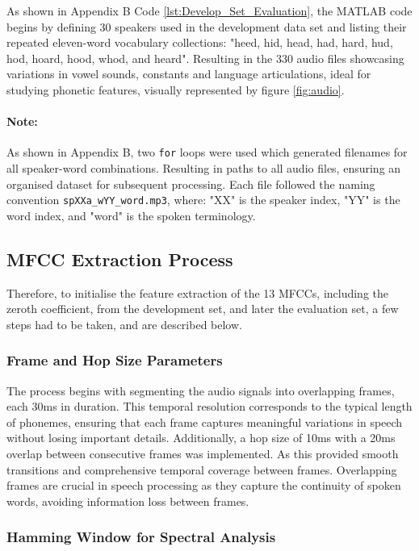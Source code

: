 \documentclass{article}
\begin{document}
As shown in Appendix B Code \ref{lst:Develop_Set_Evaluation}, the MATLAB code begins by defining 30 speakers used in the development data set and listing their repeated eleven-word vocabulary collections: "heed, hid, head, had, hard, hud, hod, hoard, hood, whod, and heard". Resulting in the 330 audio files showcasing variations in vowel sounds, constants and language articulations, ideal for studying phonetic features, visually represented by figure \ref{fig:audio}.

\paragraph{Note:} As shown in Appendix B, two \verb+for+ loops were used which generated filenames for all speaker-word combinations. Resulting in paths to all audio files, ensuring an organised dataset for subsequent processing. Each file followed the naming convention \verb+spXXa_wYY_word.mp3+, where: "XX" is the speaker index, "YY" is the word index, and "word" is the spoken terminology.

\subsection{MFCC Extraction Process}

Therefore, to initialise the feature extraction of the 13 MFCCs, including the zeroth coefficient, from the development set, and later the evaluation set, a few steps had to be taken, and are described below. 

\subsubsection{Frame and Hop Size Parameters}

The process begins with segmenting the audio signals into overlapping frames, each 30ms in duration. This temporal resolution corresponds to the typical length of phonemes, ensuring that each frame captures meaningful variations in speech without losing important details. Additionally, a hop size of 10ms with a 20ms overlap between consecutive frames was implemented. As this provided smooth transitions and comprehensive temporal coverage between frames. Overlapping frames are crucial in speech processing as they capture the continuity of spoken words, avoiding information loss between frames.

\subsubsection{Hamming Window for Spectral Analysis}
\end{document}
